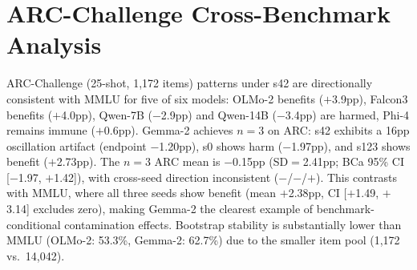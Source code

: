 \appendix
\renewcommand{\thesection}{\AlphAlph{\value{section}}}
\setlength{\belowcaptionskip}{0pt}

\section{ARC-Challenge Cross-Benchmark Analysis}
\label{sec:arc_cross_benchmark}

ARC-Challenge (25-shot, 1{,}172 items) patterns under s42 are directionally consistent with MMLU for five of six models: OLMo-2 benefits ($+$3.9pp), Falcon3 benefits ($+$4.0pp), Qwen-7B ($-$2.9pp) and Qwen-14B ($-$3.4pp) are harmed, Phi-4 remains immune ($+$0.6pp). Gemma-2 achieves $n\!=\!3$ on ARC: s42 exhibits a 16pp oscillation artifact (endpoint $-$1.20pp), s0 shows harm ($-$1.97pp), and s123 shows benefit ($+$2.73pp). The $n\!=\!3$ ARC mean is $-$0.15pp (SD$=$2.41pp; BCa 95\% CI [$-$1.97, $+$1.42]), with cross-seed direction inconsistent ($-$/$-$/$+$). This contrasts with MMLU, where all three seeds show benefit (mean $+$2.38pp, CI [$+$1.49, $+$3.14] excludes zero), making Gemma-2 the clearest example of benchmark-conditional contamination effects. Bootstrap stability is substantially lower than MMLU (OLMo-2: 53.3\%, Gemma-2: 62.7\%) due to the smaller item pool (1{,}172 vs.\ 14{,}042).

